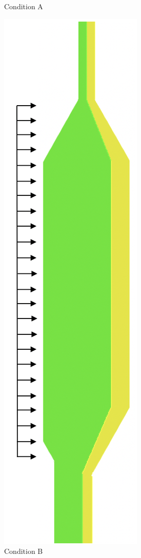 \begin{figure}[!htb]
\begin{subfigure}{.32\textwidth}
  \caption{Condition A}
\end{subfigure}
\begin{subfigure}{.32\textwidth}
  \centering
  \includegraphics[height=1.5\linewidth]{figs/bc_B.png}
  \caption{Condition B}
\end{subfigure}
\begin{subfigure}{.32\textwidth}
  \centering

\end{subfigure}
\end{figure}
